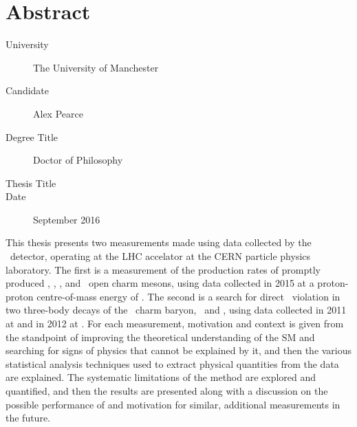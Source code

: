\chapter{Abstract}

\begin{description}
  \item[University] The University of Manchester
  \item[Candidate] Alex Pearce
  \item[Degree Title] Doctor of Philosophy
  \item[Thesis Title] \thetitle
  \item[Date] September 2016
\end{description}

This thesis presents two measurements made using data collected by the \lhcb\ 
detector, operating at the \acl{LHC} accelator at the CERN particle physics 
laboratory.
The first is a measurement of the production rates of promptly produced 
\PDzero, \PDplus, \PDsplus, and \PDstarp\ open charm mesons, using data 
collected in 2015 at a proton-proton centre-of-mass energy of .
The second is a search for direct \CP\ violation in two three-body decays of 
the \PLambdac\ charm baryon, \pKK\ and \ppipi, using data collected in 2011 at 
\sqrtseq{7} and in 2012 at \sqrtseq{8}.
For each measurement, motivation and context is given from the standpoint of 
improving the theoretical understanding of the \acl{SM} and searching for signs 
of physics that cannot be explained by it, and then the various statistical 
analysis techniques used to extract physical quantities from the data are 
explained.
The systematic limitations of the method are explored and quantified, and then 
the results are presented along with a discussion on the possible performance 
of and motivation for similar, additional measurements in the future.

